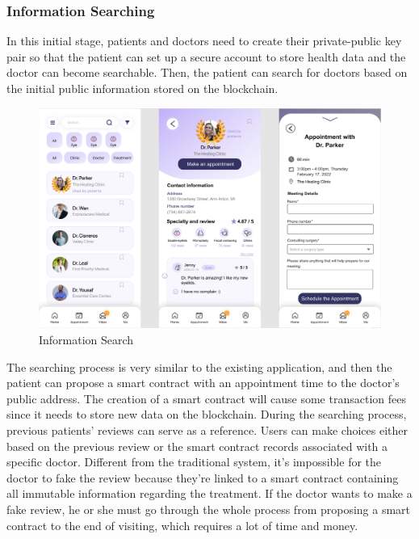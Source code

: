 \documentclass{article}
\begin{document}
\subsubsection{Information Searching}
In this initial stage, patients and doctors need to create their private-public key pair so that the patient can set up a secure account to store health data and the doctor can become searchable. Then, the patient can search for doctors based on the initial public information stored on the blockchain.
\begin{figure}[H]
    \centering
    \includegraphics[scale=0.5]{Appointment.jpg}
    \caption{Information Search}
\end{figure}
The searching process is very similar to the existing application, and then the patient can propose a smart contract with an appointment time to the doctor's public address. The creation of a smart contract will cause some transaction fees since it needs to store new data on the blockchain. During the searching process, previous patients' reviews can serve as a reference. Users can make choices either based on the previous review or the smart contract records associated with a specific doctor. Different from the traditional system, it's impossible for the doctor to fake the review because they're linked to a  smart contract containing all immutable information regarding the treatment. If the doctor wants to make a fake review, he or she must go through the whole process from proposing a smart contract to the end of visiting, which requires a lot of time and money.
\end{document}
